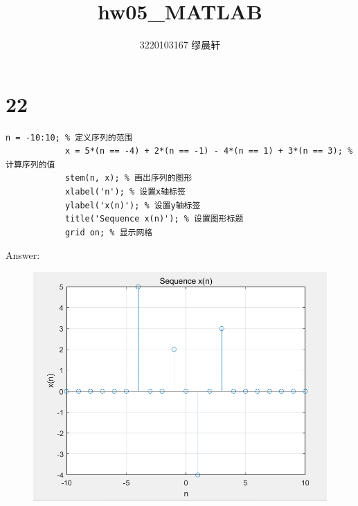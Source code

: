 \documentclass{article}
\title{hw05\_MATLAB}
\author{3220103167 缪晨轩}
\date{\zhdate{2024/3/30}}
\begin{document}
    \maketitle
    \section*{22}
        \begin{lstlisting}[caption={题22 MATLAB代码}, label={lst:matlab}]
            n = -10:10; % 定义序列的范围
            x = 5*(n == -4) + 2*(n == -1) - 4*(n == 1) + 3*(n == 3); % 计算序列的值
            stem(n, x); % 画出序列的图形
            xlabel('n'); % 设置x轴标签
            ylabel('x(n)'); % 设置y轴标签
            title('Sequence x(n)'); % 设置图形标题
            grid on; % 显示网格

        \end{lstlisting}
        Answer: 
            \begin{figure}[h]
                \includegraphics[scale=0.75]{22.png}
            \end{figure}
            \FloatBarrier
\end{document}
